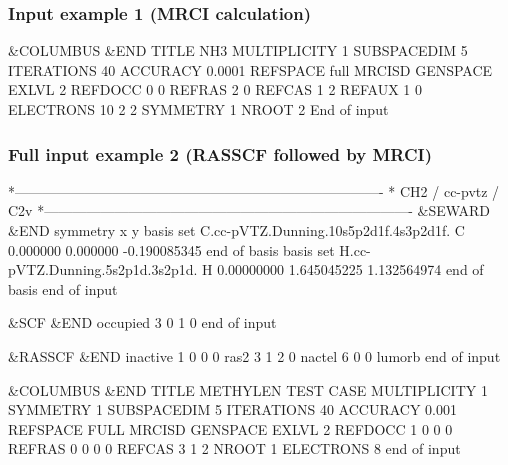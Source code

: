 \subsubsection{Input example 1 (MRCI calculation)}
 
\begin{inputlisting}
 &COLUMBUS &END
TITLE
 NH3
MULTIPLICITY
 1
SUBSPACEDIM
 5
ITERATIONS
40 
ACCURACY
 0.0001
REFSPACE
 full
MRCISD
GENSPACE
EXLVL
 2
REFDOCC
 0 0
REFRAS
 2 0
REFCAS
 1 2
REFAUX
 1 0
ELECTRONS
 10  2  2
SYMMETRY
 1
NROOT
 2
End of input
\end{inputlisting}

\subsubsection{Full input example 2 (RASSCF followed by MRCI)}

\begin{inputlisting}
*-------------------------------------------------------------------------------
* CH2 / cc-pvtz / C2v
*-------------------------------------------------------------------------------
 &SEWARD   &END
symmetry
x y
basis set
C.cc-pVTZ.Dunning.10s5p2d1f.4s3p2d1f.
C 0.000000 0.000000 -0.190085345
end of basis
basis set
H.cc-pVTZ.Dunning.5s2p1d.3s2p1d.
H 0.00000000 1.645045225 1.132564974
end of basis
end of input

 &SCF  &END
occupied
3 0 1 0
end of input

 &RASSCF  &END
inactive
1 0 0 0
ras2
3 1 2 0
nactel
6 0 0
lumorb
end of input

 &COLUMBUS &END
TITLE
 METHYLEN TEST CASE
MULTIPLICITY
 1
SYMMETRY
 1
SUBSPACEDIM
 5
ITERATIONS
 40 
ACCURACY
 0.001
REFSPACE
 FULL
MRCISD
GENSPACE
EXLVL
 2
REFDOCC
 1 0 0 0
REFRAS
 0 0 0 0
REFCAS
 3 1 2
NROOT
 1
ELECTRONS
 8
end of input 

\end{inputlisting}



